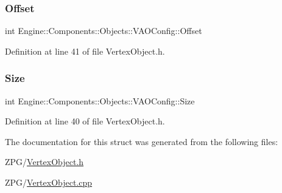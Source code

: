\subsubsection{\texorpdfstring{Offset}{Offset}}
{\footnotesize\ttfamily int Engine\+::\+Components\+::\+Objects\+::\+V\+A\+O\+Config\+::\+Offset}



Definition at line 41 of file Vertex\+Object.\+h.

\mbox{\label{structEngine_1_1Components_1_1Objects_1_1VAOConfig_a1591984c2db527f1e17d8965039b9d9c}} 
\subsubsection{\texorpdfstring{Size}{Size}}
{\footnotesize\ttfamily int Engine\+::\+Components\+::\+Objects\+::\+V\+A\+O\+Config\+::\+Size}



Definition at line 40 of file Vertex\+Object.\+h.



The documentation for this struct was generated from the following files\+:\begin{DoxyCompactItemize}
\item 
Z\+P\+G/\mbox{\hyperlink{VertexObject_8h}{Vertex\+Object.\+h}}\item 
Z\+P\+G/\mbox{\hyperlink{VertexObject_8cpp}{Vertex\+Object.\+cpp}}\end{DoxyCompactItemize}
